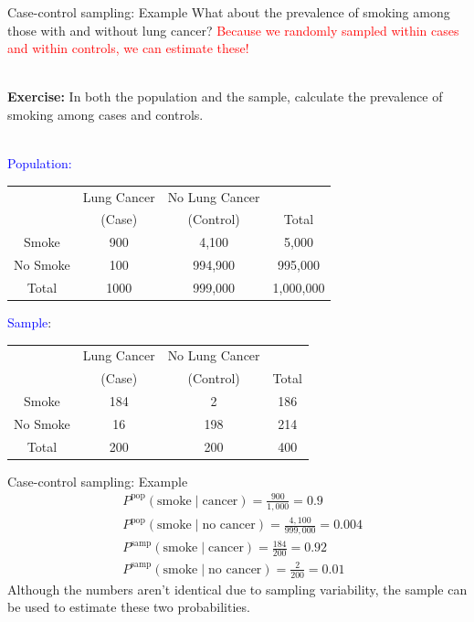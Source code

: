 \documentclass[10pt,t]{beamer}
\begin{document}
\begin{frame}{Case-control sampling: Example}
	\small
	\vspace{-0.7cm}
	What about the prevalence of smoking among those with and without lung cancer? \textcolor{red}{Because we randomly sampled within cases and within controls, we can estimate these!}
	\\ ~\
	
	\textbf{Exercise:} In both the population and the sample, calculate the prevalence of smoking among cases and controls.
	\\ ~\

	\textcolor{blue}{Population:} 
		\begin{center}
		\begin{table}
			\begin{tabular}{|c|cc|c|}
				\hline 
				& Lung Cancer & No Lung Cancer &  \\ 
				& (Case) & (Control) & Total  \\
				\hline 
				Smoke & 900 & 4,100  & 5,000 \\ 
				No Smoke & 100 & 994,900 & 995,000  \\ 
				\hline 
				Total & 1000 & 999,000 & 1,000,000 \\ 
				\hline 
			\end{tabular}
		\end{table}
	\end{center}
 \textcolor{blue}{Sample}:
	\begin{center}
		\begin{table}
			\begin{tabular}{|c|cc|c|}
				\hline 
				& Lung Cancer & No Lung Cancer &  \\ 
				& (Case) & (Control) & Total  \\
				\hline 
				Smoke & 184 & 2  & 186 \\ 
				No Smoke & 16 & 198 & 214  \\ 
				\hline 
				Total & 200 & 200 & 400 \\ 
				\hline 
			\end{tabular}
		\end{table}
	\end{center}
\end{frame}

\begin{frame}{Case-control sampling: Example}
	\begin{align*}
		&P^{\text{pop}}(\text{smoke} \mid \text{cancer}) = \frac{900}{1,000} = 0.9\\
		&P^{\text{pop}}(\text{smoke} \mid \text{no cancer}) = \frac{4,100}{999,000} = 0.004\\
		&P^{\text{samp}}(\text{smoke} \mid \text{cancer}) = \frac{184}{200} = 0.92\\
		&P^{\text{samp}}(\text{smoke} \mid \text{no cancer}) = \frac{2}{200} = 0.01
	\end{align*}
	Although the numbers aren't identical due to sampling variability, the sample can be used to estimate these two probabilities. 
\end{frame}
\end{document}
